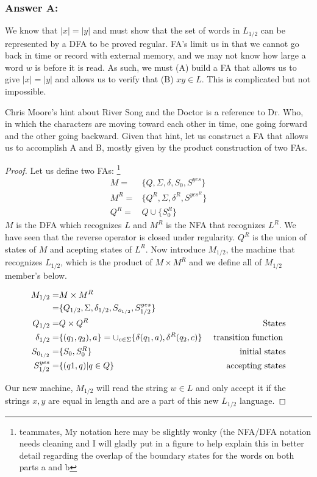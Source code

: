 \documentclass[titlepage]{article}\usepackage[]{graphicx}\usepackage[]{color}
\begin{document}
\subsubsection*{Answer A:}
We know that $|x| = |y|$ and must show that the set of words in $L_{1/2}$ can
be represented by a DFA to be proved regular. FA's limit us in that we cannot
go back in time or record with external memory, and we may not know how large a
word $w$ is before it is read. As such, we must (A) build a FA that allows us to
give $|x| = |y|$ and allows us to verify that (B) $xy \in L$. This is complicated
but not impossible.

Chris Moore's hint about River Song and the Doctor is a reference to Dr. Who,
in which the characters are moving toward each other in time, one going
forward and the other going backward. Given that hint, let us construct a FA
that allows us to accomplish A and B, mostly given by the product construction
of two FAs.

\begin{proof}
	Let us define two FAs:
        \footnote{teammates, My notation here may be slightly wonky (the
          NFA/DFA notation needs cleaning and I will gladly
        put in a figure to help explain this in better detail regarding the overlap of
        the boundary states for the words on both parts a and b}
	\begin{align}
		M =& \{Q, \Sigma, \delta, S_0, S^{yes}\} \\
		M^R =& \{ Q^R, \Sigma, \delta^R, S^{yes^R} \} \\
		Q^R = & Q \cup \{S_{0}^R \}
	\end{align}
	$M$ is the DFA which recognizes $L$ and $M^R$ is the NFA that recognizes
	$L^R$. We have seen that the reverse operator is closed under
	regularity. $Q^R$ is the union of states of $M$ and acepting states of
	$L^R$.
        Now introduce $M_{1/2}$, the machine that recognizes $L_{1/2}$, which
        is the product of $M \times M^R$ and we define all of $M_{1/2}$
        member's below.
        
        \begin{align}
          M_{1/2} = & M \times M^R \\ = &  \{ Q_{1/2}, \Sigma, \delta_{1/2}, S_{o_{1/2}}, S_{1/2}^{yes}  \} & \\
          Q_{1/2} = & Q \times Q^R \hfill & \text{States} \\ 
          \delta_{1/2} = & \{ (q_1, q_2), a\} = \cup_{c \in \Sigma} \{ \delta (q_1, a), \delta^R (q_2, c)\} &\text{ transition function }\\ 
          S_{0_{1/2}} = & \{ S_0, S_0^R \} & \text{ initial states} \\
          S^{yes}_{1/2} = & \{ (q1,q) | q \in Q \} & \text{ accepting states}
	\end{align}

        Our new machine, $M_{1/2}$ will read the string $w \in L$ and only
        accept it if the strings $x,y$ are equal in length and are a part of
        this new $L_{1/2}$ language. 
\end{proof}
\end{document}

